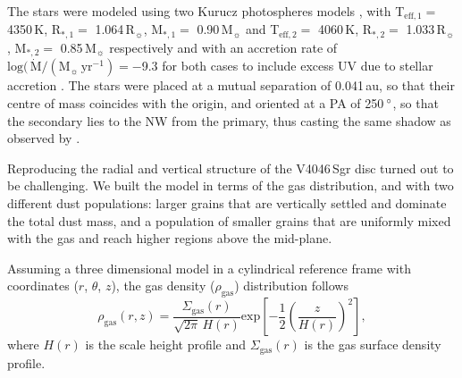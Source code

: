 \documentclass[fleqn,usenatbib,useAMS]{mnras}
\begin{document}
The stars were modeled using two Kurucz photospheres models \citep{1979ApJS...40....1K, 1997A&A...318..841C}, with T$_{\mathrm{eff},1} =$ 4350\,K, R$_{*,1} =$ 1.064\,R$_{\sun}$, M$_{*,1} =$ 0.90\,M$_{\sun}$ and T$_{\mathrm{eff},2} =$ 4060\,K, R$_{*,2} =$ 1.033\,R$_{\sun}$, M$_{*,2} =$ 0.85\,M$_{\sun}$ respectively and with an accretion rate of $\mathrm{log}(\,\dot{\mathrm{M}}/(\mathrm{M}_{\sun}\,\mathrm{yr^{-1}}) = -$9.3 for both cases to include excess UV due to stellar accretion \citep{10.1111/j.1365-2966.2011.19366.x}. The stars were placed at a mutual separation of 0.041\,au, so that their centre of mass coincides with the origin, and oriented at a PA of 250\,$\hbox{$^\circ$}$, so that the secondary lies to the NW from the primary, thus casting the same shadow as observed by \citet{dOrazi}.

Reproducing the radial and vertical structure of the V4046\,Sgr disc turned out to be challenging. We built the model in terms of the gas distribution, and with two different dust populations: larger grains that are vertically settled and dominate the total dust mass, and a population of smaller grains that are uniformly mixed with the gas and reach higher regions above the mid-plane. 

Assuming a three dimensional model in a cylindrical reference frame with coordinates ($r$, $\theta$, $z$), the gas density ($\rho_{\mathrm{gas}}$) distribution follows
\begin{equation}
  \rho_{\mathrm{gas}}(r,z) =\frac{\Sigma_{\mathrm{gas}}(r)}{\sqrt{2\pi} \, H(r)} \mathrm{exp}\left[-\frac{1}{2} \left(\frac{z}{H(r)}\right)^2\right],
\end{equation}
where $H(r)$ is the scale height profile and $\Sigma_{\mathrm{gas}}(r)$ is the gas surface density profile. 
\end{document}
